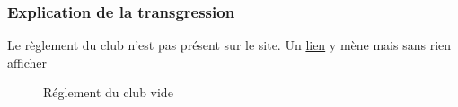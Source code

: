 \documentclass{article}[12pt]
\begin{document}
     \subsubsection*{Explication de la transgression}
     Le règlement du club n'est pas présent sur le site. Un \href{http://www.tennisclubdeparis.fr/reglement.html}{lien}  y mène mais sans rien afficher 
    
     \begin{figure}[H]
     	\centering
     	\caption{Réglement du club vide}
     \end{figure}
     \newpage
\end{document}
